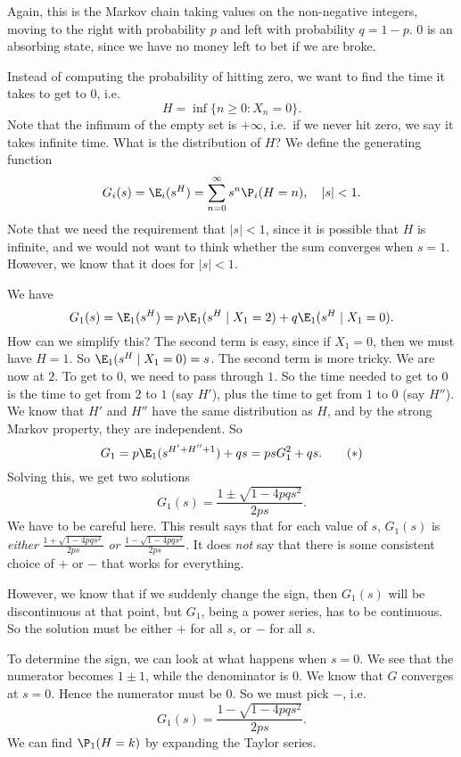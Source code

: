 \documentclass[a4paper]{article}
\begin{document}
\begin{eg}
  Again, this is the Markov chain taking values on the non-negative integers, moving to the right with probability $p$ and left with probability $q = 1 - p$. $0$ is an absorbing state, since we have no money left to bet if we are broke.

  Instead of computing the probability of hitting zero, we want to find the time it takes to get to $0$, i.e.
  \[
    H = \inf\{n \geq 0: X_n = 0\}.
  \]
  Note that the infimum of the empty set is $+\infty$, i.e.\ if we never hit zero, we say it takes infinite time. What is the distribution of $H$? We define the generating function
  \[
    G_i(s) = \E_i(s^H) = \sum_{n = 0}^\infty s^n \P_i(H = n),\quad |s| < 1.
  \]
  Note that we need the requirement that $|s| < 1$, since it is possible that $H$ is infinite, and we would not want to think whether the sum converges when $s = 1$. However, we know that it does for $|s| < 1$.

  We have
  \[
    G_1(s) = \E_1(s^H) = p\E_1(s^H\mid X_1 = 2) + q\E_1(s^H\mid X_1 = 0).
  \]
  How can we simplify this? The second term is easy, since if $X_1 = 0$, then we must have $H = 1$. So $\E_1(s^H\mid X_1 = 0) = s$. The second term is more tricky. We are now at $2$. To get to $0$, we need to pass through $1$. So the time needed to get to $0$ is the time to get from $2$ to $1$ (say $H'$), plus the time to get from $1$ to $0$ (say $H''$). We know that $H'$ and $H''$ have the same distribution as $H$, and by the strong Markov property, they are independent. So
  \[
    G_1 = p\E_1(s^{H' + H'' + 1}) + qs = psG_1^2 + qs.\tag{$*$}
  \]
  Solving this, we get two solutions
  \[
    G_1 (s) = \frac{1 \pm \sqrt{1 - 4pqs^2}}{2ps}.
  \]
  We have to be careful here. This result says that for each value of $s$, $G_1(s)$ is \emph{either} $\frac{1 + \sqrt{1 - 4pqs^2}}{2ps}$ \emph{or} $\frac{1 - \sqrt{1 - 4pqs^2}}{2ps}$. It does \emph{not} say that there is some consistent choice of $+$ or $-$ that works for everything.

  However, we know that if we suddenly change the sign, then $G_1(s)$ will be discontinuous at that point, but $G_1$, being a power series, has to be continuous. So the solution must be either $+$ for all $s$, or $-$ for all $s$.

  To determine the sign, we can look at what happens when $s = 0$. We see that the numerator becomes $1 \pm 1$, while the denominator is $0$. We know that $G$ converges at $s = 0$. Hence the numerator must be $0$. So we must pick $-$, i.e.
  \[
    G_1 (s) = \frac{1 - \sqrt{1 - 4pqs^2}}{2ps}.
  \]
  We can find $\P_1(H = k)$ by expanding the Taylor series.


\end{eg}
\end{document}

